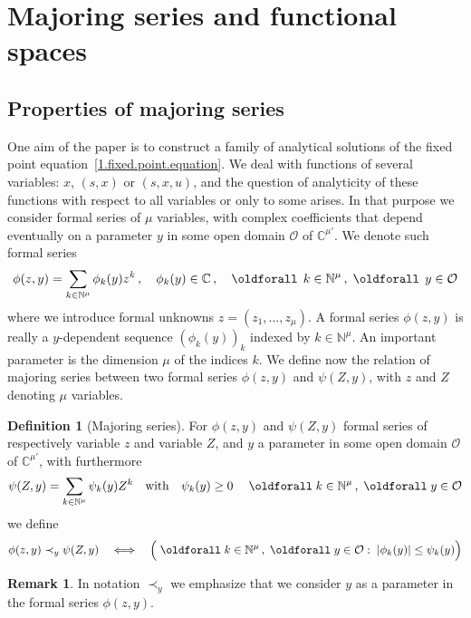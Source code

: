\documentclass[10pt]{amsart}
\theoremstyle{definition}
\newtheorem{rema}[cdrthm]{Remark}
\newtheorem{defi}[cdrthm]{Definition}
\theoremstyle{plain}
\newcommand*\Cbb{{\mathbb C}}%
\newcommand*\N{{\mathbb N}}
\renewcommand*{\forall}{\mathrel{\oldforall}}
\begin{document}
\section{Majoring series and functional spaces}\label{1.section.spaces}



\subsection{Properties of majoring series}\label{1.subsection.majoring}

One aim of the paper is to construct a family of analytical solutions of the fixed point equation~\eqref{1.fixed.point.equation}. We deal with functions of several variables: $x$, $(s,x)$ or $(s,x,u)$, and the question of analyticity of these functions with respect to all variables or only to some arises. In that purpose we consider formal series of $\mu$ variables, with complex coefficients that depend eventually on a parameter $y$ in some open domain $\mathcal{O}$ of $\Cbb^{\mu'}$. We denote such formal series
\[
\phi(z,y) = \sum_{k\in\N^{\mu}} \phi_{k}(y) z^{k} \,, \quad \phi_{k}(y) \in \Cbb \,, \quad \forall \, k\in\N^{\mu}\,, \; \forall \, y\in\mathcal{O}
\]
where we introduce formal unknowns $z = (z_1,\ldots,z_{\mu})$. A formal series $\phi(z,y)$ is really a $y$-dependent sequence $\left(\phi_k(y)\right)_k$ indexed by $k\in\N^{\mu}$. An important parameter is the dimension $\mu$ of the indices $k$. We define now the relation of majoring series between two formal series $\phi(z,y)$ and $\psi(Z,y)$, with $z$ and $Z$ denoting $\mu$ variables.

\begin{defi}[Majoring series]\label{1.definition.maj}
For $\phi(z,y)$ and $\psi(Z,y)$ formal series of respectively variable $z$ and variable $Z$, and $y$ a parameter in some open domain $\mathcal{O}$ of $\Cbb^{\mu'}$, with furthermore
\[
\psi(Z,y) = \sum_{k\in\N^{\mu}} \psi_k(y) Z^{k} \quad \text{with} \quad \psi_k(y) \geq 0 \quad \forall k\in\N^{\mu} \,,\; \forall y\in\mathcal{O}
\]
we define
\begin{equation}\label{1.def.majoring.series}
\phi(z,y) \prec_{y} \psi(Z,y) \quad \Longleftrightarrow \quad \Big(\forall k\in\N^{\mu}\,,\; \forall y\in\mathcal{O} : \; |\phi_k(y)| \leq \psi_k(y) \Big)
\end{equation}
\end{defi}

\begin{rema}
In notation $\prec_{y}$ we emphasize that we consider $y$ as a parameter in the formal series $\phi(z,y)$.
\end{rema}
\end{document}
